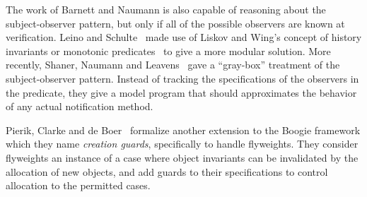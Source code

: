 The work of Barnett and Naumann is also capable of reasoning about the
subject-observer pattern, but only if all of the possible observers
are known at verification.  Leino and Schulte~\cite{boogie-sub-obs}
made use of Liskov and Wing's concept of history invariants or
monotonic predicates~\cite{liskov-wing} to give a more modular
solution. More recently, Shaner, Naumann and Leavens~\cite{ShanerLN07}
gave a ``gray-box'' treatment of the subject-observer pattern.
Instead of tracking the specifications of the observers in the
predicate, they give a model program that should approximates the
behavior of any actual notification method.

Pierik, Clarke and de Boer~\cite{creational-invariants} formalize another
extension to the Boogie framework which they name \emph{creation
  guards}, specifically to handle flyweights. They consider flyweights
an instance of a case where object invariants can be invalidated by
the allocation of new objects, and add guards to their specifications
to control allocation to the permitted cases. 



